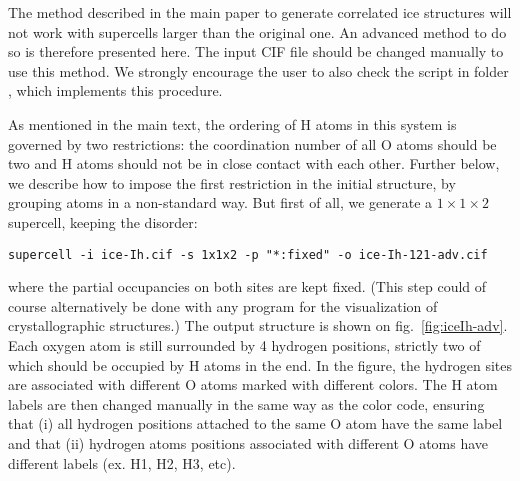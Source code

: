\documentclass[a4paper,10pt]{article}
\begin{document}
The method described in the main paper to generate correlated ice  structures will not work with supercells larger than the original one. An advanced method to do so is therefore presented here. The input CIF file should be changed manually to use this method. We strongly encourage the user to also check the  script in folder , which implements this procedure. 

As mentioned in the main text, the ordering of H atoms in this system is governed by two restrictions: the coordination number of all O atoms should be two and H atoms should not be in close contact with each other. Further below, we describe how to impose the first restriction in the initial structure, by grouping atoms in a non-standard way. But first of all, we generate a $1\times1\times2$ supercell, keeping the disorder:
\begin{Verbatim}[breaklines]
  supercell -i ice-Ih.cif -s 1x1x2 -p "*:fixed" -o ice-Ih-121-adv.cif
\end{Verbatim}
where the partial occupancies on both sites are kept fixed. (This step could of course alternatively be done with any program for the visualization of crystallographic structures.) The output structure is shown on fig.~\ref{fig:iceIh-adv}. Each oxygen atom is still surrounded by 4 hydrogen positions, strictly two of which should be occupied by H atoms in the end. In the figure, the hydrogen sites are associated with different O atoms marked with different colors. The H atom labels are then changed manually in the same way as the color code, ensuring that (i) all hydrogen positions attached to the same O atom have the same label and that (ii) hydrogen atoms positions associated with different O atoms have different labels (ex. H1, H2, H3, etc).
\end{document}
